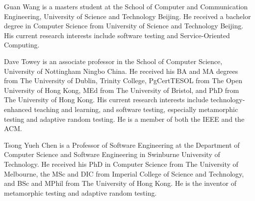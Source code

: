 \documentclass[10pt,journal,compsoc]{IEEEtran}
\begin{document}
\vspace{-10ex}
\begin{IEEEbiography}{Guan Wang} is a masters student at the School of Computer and Communication Engineering, University of Science and Technology Beijing. He received a bachelor degree in Computer Science from University of Science and Technology Beijing. His current research interests include software testing and Service-Oriented Computing.
\end{IEEEbiography}
\vspace{-10ex}
\begin{IEEEbiography}{Dave Towey} is an associate professor in the School of Computer Science, University of Nottingham Ningbo China. He received his BA and MA degrees from The University of Dublin, Trinity College, PgCertTESOL from The Open University of Hong Kong, MEd from The University of Bristol, and PhD from The University of Hong Kong. His current research interests include technology-enhanced teaching and learning, and software testing, especially metamorphic testing and adaptive random testing. He is a  member of both the IEEE and the ACM.
\end{IEEEbiography}
\vspace{-10ex}
\begin{IEEEbiography}{Tsong Yueh Chen} is a Professor of Software Engineering at the Department of Computer Science and Software Engineering in Swinburne University of Technology. He received his PhD in Computer Science from The University of Melbourne, the MSc and DIC from Imperial College of Science and Technology, and BSc and MPhil from The University of Hong Kong. He is the inventor of metamorphic testing and adaptive random testing.
\end{IEEEbiography}
\end{document}
